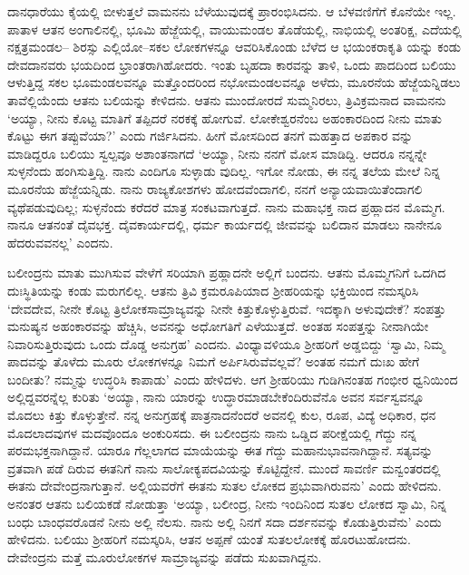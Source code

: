 ದಾನಧಾರೆಯು ಕೈಯಲ್ಲಿ ಬೀಳುತ್ತಲೆ ವಾಮನನು ಬೆಳೆಯುವುದಕ್ಕೆ ಪ್ರಾರಂಭಿಸಿದನು. ಆ ಬೆಳವಣಿಗೆಗೆ ಕೊನೆಯೇ ಇಲ್ಲ. ಪಾತಾಳ ಆತನ ಅಂಗಾಲಿನಲ್ಲಿ, ಭೂಮಿ ಹೆಜ್ಜೆಯಲ್ಲಿ, ವಾಯುಮಂಡಲ ತೊಡೆಯಲ್ಲಿ, ನಾಭಿಯಲ್ಲಿ ಅಂತರಿಕ್ಷ, ಎದೆಯಲ್ಲಿ ನಕ್ಷತ್ರಮಂಡಲ– ಶಿರಸ್ಸು ಎಲ್ಲಿಯೋ–ಸಕಲ ಲೋಕಗಳನ್ನೂ ಆವರಿಸಿಕೊಂಡು ಬೆಳೆದ ಆ ಭಯಂಕರಾಕೃತಿ ಯನ್ನು ಕಂಡು ದೇವದಾನವರು ಭಯದಿಂದ ಭ್ರಾಂತರಾಗಿಹೋದರು. ಇಂತು ಬೃಹದಾ ಕಾರವನ್ನು ತಾಳಿ, ಒಂದು ಪಾದದಿಂದ ಬಲಿಯು ಆಳುತ್ತಿದ್ದ ಸಕಲ ಭೂಮಂಡಲವನ್ನೂ ಮತ್ತೊಂದರಿಂದ ನಭೋಮಂಡಲವನ್ನೂ ಅಳೆದು, ಮೂರನೆಯ ಹೆಜ್ಜೆಯನ್ನಿಡಲು ತಾವೆಲ್ಲಿಯೆಂದು ಆತನು ಬಲಿಯನ್ನು ಕೇಳಿದನು. ಆತನು ಮುಂದೋರದೆ ಸುಮ್ಮನಿರಲು, ತ್ರಿವಿಕ್ರಮನಾದ ವಾಮನನು ‘ಅಯ್ಯಾ, ನೀನು ಕೊಟ್ಟ ಮಾತಿಗೆ ತಪ್ಪಿದರೆ ನರಕಕ್ಕೆ ಹೋಗುವೆ. ಲೋಕೇಶ್ವರನೆಂಬ ಅಹಂಕಾರದಿಂದ ನೀನು ಮಾತು ಕೊಟ್ಟು ಈಗ ತಪ್ಪುವೆಯಾ?’ ಎಂದು ಗರ್ಜಿಸಿದನು. ಹೀಗೆ ಮೋಸದಿಂದ ತನಗೆ ಮಹತ್ತಾದ ಅಪಕಾರ ವನ್ನು ಮಾಡಿದ್ದರೂ ಬಲಿಯು ಸ್ವಲ್ಪವೂ ಅಶಾಂತನಾಗದೆ ‘ಅಯ್ಯಾ, ನೀನು ನನಗೆ ಮೋಸ ಮಾಡಿದ್ದಿ. ಆದರೂ ನನ್ನನ್ನೇ ಸುಳ್ಳನೆಂದು ಹಂಗಿಸುತ್ತಿದ್ದಿ. ನಾನು ಎಂದಿಗೂ ಸುಳ್ಳಾಡು ವುದಿಲ್ಲ. ಇಗೋ ನೋಡು, ಈ ನನ್ನ ತಲೆಯ ಮೇಲೆ ನಿನ್ನ ಮೂರನೆಯ ಹೆಜ್ಜೆಯನ್ನಿಡು. ನಾನು ರಾಜ್ಯಕೋಶಗಳು ಹೋದವೆಂದಾಗಲಿ, ನನಗೆ ಅನ್ಯಾಯವಾಯಿತೆಂದಾಗಲಿ ವ್ಯಥೆಪಡುವುದಿಲ್ಲ; ಸುಳ್ಳನೆಂದು ಕರೆದರೆ ಮಾತ್ರ ಸಂಕಟವಾಗುತ್ತದೆ. ನಾನು ಮಹಾಭಕ್ತ ನಾದ ಪ್ರಹ್ಲಾದನ ಮೊಮ್ಮಗ. ನಾನೂ ಆತನಂತೆ ದೈವಭಕ್ತ. ದೈವಕಾರ್ಯದಲ್ಲಿ, ಧರ್ಮ ಕಾರ್ಯದಲ್ಲಿ ಜೀವವನ್ನು ಬಲಿದಾನ ಮಾಡಲು ನಾನೇನೂ ಹೆದರುವವನಲ್ಲ’ ಎಂದನು.

ಬಲೀಂದ್ರನು ಮಾತು ಮುಗಿಸುವ ವೇಳೆಗೆ ಸರಿಯಾಗಿ ಪ್ರಹ್ಲಾದನೇ ಅಲ್ಲಿಗೆ ಬಂದನು. ಆತನು ಮೊಮ್ಮಗನಿಗೆ ಒದಗಿದ ದುಃಸ್ಥಿತಿಯನ್ನು ಕಂಡು ಮರುಗಲಿಲ್ಲ. ಆತನು ತ್ರಿವಿ ಕ್ರಮರೂಪಿಯಾದ ಶ್ರೀಹರಿಯನ್ನು ಭಕ್ತಿಯಿಂದ ನಮಸ್ಕರಿಸಿ ‘ದೇವದೇವ, ನೀನೇ ಕೊಟ್ಟ ತ್ರಿಲೋಕಸಾಮ್ರಾಜ್ಯವನ್ನು ನೀನೇ ಕಿತ್ತುಕೊಳ್ಳುತ್ತಿರುವೆ. ಇದಕ್ಕಾಗಿ ಅಳುವುದೇಕೆ? ಸಂಪತ್ತು ಮನುಷ್ಯನ ಅಹಂಕಾರವನ್ನು ಹೆಚ್ಚಿಸಿ, ಅವನನ್ನು ಅಧೋಗತಿಗೆ ಎಳೆಯುತ್ತದೆ. ಅಂತಹ ಸಂಪತ್ತನ್ನು ನೀನಾಗಿಯೇ ನಿವಾರಿಸುತ್ತಿರುವುದು ಒಂದು ದೊಡ್ಡ ಅನುಗ್ರಹ’ ಎಂದನು. ವಿಂಧ್ಯಾವಳಿಯೂ ಶ್ರೀಹರಿಗೆ ಅಡ್ಡಬಿದ್ದು ‘ಸ್ವಾಮಿ, ನಿಮ್ಮ ಪಾದವನ್ನು ತೊಳೆದು ಮೂರು ಲೋಕಗಳನ್ನೂ ನಿಮಗೆ ಅರ್ಪಿಸಿರುವೆವಲ್ಲವೆ? ಅಂತಹ ನಮಗೆ ದುಃಖ ಹೇಗೆ ಬಂದೀತು? ನಮ್ಮನ್ನು ಉದ್ಧರಿಸಿ ಕಾಪಾಡು’ ಎಂದು ಹೇಳಿದಳು. ಆಗ ಶ್ರೀಹರಿಯು ಗುಡಿಗಿನಂತಹ ಗಂಭೀರ ಧ್ವನಿಯಿಂದ ಅಲ್ಲಿದ್ದವರನ್ನೆಲ್ಲ ಕುರಿತು ‘ಅಯ್ಯಾ, ನಾನು ಯಾರನ್ನು ಉದ್ಧಾರಮಾಡಬೇಕೆಂದಿರುವೆನೊ ಅವನ ಸರ್ವಸ್ವವನ್ನೂ ಮೊದಲು ಕಿತ್ತು ಕೊಳ್ಳುತ್ತೇನೆ. ನನ್ನ ಅನುಗ್ರಹಕ್ಕೆ ಪಾತ್ರನಾದನೆಂದರೆ ಅವನಲ್ಲಿ ಕುಲ, ರೂಪ, ವಿದ್ಯೆ ಅಧಿಕಾರ, ಧನ ಮೊದಲಾದವುಗಳ ಮದವೊಂದೂ ಅಂಕುರಿಸದು. ಈ ಬಲೀಂದ್ರನು ನಾನು ಒಡ್ಡಿದ ಪರೀಕ್ಷೆಯಲ್ಲಿ ಗೆದ್ದು ನನ್ನ ಪರಮಭಕ್ತನಾಗಿದ್ದಾನೆ. ಯಾರೂ ಗೆಲ್ಲಲಾಗದ ಮಾಯೆಯನ್ನು ಈತ ಗೆದ್ದು ಮಹಾನುಭಾವನಾಗಿದ್ದಾನೆ. ಸತ್ಯವನ್ನು ವ್ರತವಾಗಿ ಪಡೆ ದಿರುವ ಈತನಿಗೆ ನಾನು ಸಾಲೋಕ್ಯಪದವಿಯನ್ನು ಕೊಟ್ಟಿದ್ದೇನೆ. ಮುಂದೆ ಸಾವರ್ಣಿ ಮನ್ವಂತರದಲ್ಲಿ ಈತನು ದೇವೇಂದ್ರನಾಗುತ್ತಾನೆ. ಅಲ್ಲಿಯವರೆಗೆ ಈತನು ಸುತಲ ಲೋಕದ ಪ್ರಭುವಾಗಿರುವನು’ ಎಂದು ಹೇಳಿದನು. ಅನಂತರ ಆತನು ಬಲಿಯಕಡೆ ನೋಡುತ್ತಾ ‘ಅಯ್ಯಾ, ಬಲೀಂದ್ರ, ನೀನು ಇಂದಿನಿಂದ ಸುತಲ ಲೋಕದ ಸ್ವಾಮಿ, ನಿನ್ನ ಬಂಧು ಬಾಂಧವರೊಡನೆ ನೀನು ಅಲ್ಲಿ ನೆಲಸು. ನಾನು ಅಲ್ಲಿ ನಿನಗೆ ಸದಾ ದರ್ಶನವನ್ನು ಕೊಡುತ್ತಿರುವೆನು’ ಎಂದು ಹೇಳಿದನು. ಬಲಿಯು ಶ್ರೀಹರಿಗೆ ನಮಸ್ಕರಿಸಿ, ಆತನ ಅಪ್ಪಣೆ ಯಂತೆ ಸುತಲಲೋಕಕ್ಕೆ ಹೊರಟುಹೋದನು. ದೇವೇಂದ್ರನು ಮತ್ತೆ ಮೂರುಲೋಕಗಳ ಸಾಮ್ರಾಜ್ಯವನ್ನು ಪಡೆದು ಸುಖವಾಗಿದ್ದನು.

